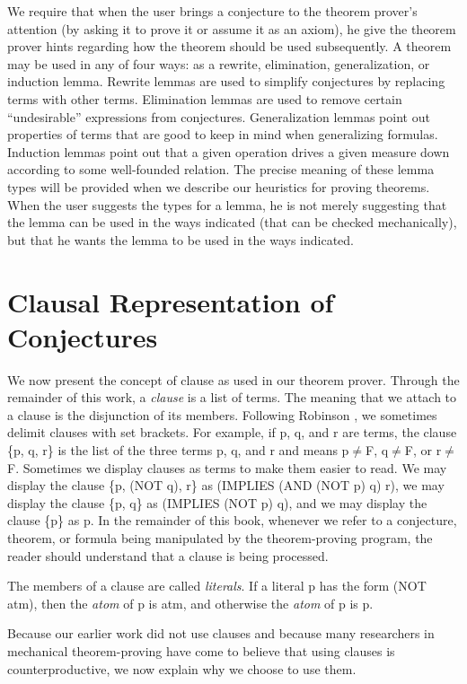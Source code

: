 \documentclass[11pt]{book}
\newcommand{\pubinlineunderline}[1]{\emph{#1}}
\newcommand{\pubdefaulttextsize}{\large}
\begin{document}
We  require that when the user brings a  conjecture
to the theorem prover's attention (by asking it to prove it or assume it as an axiom), he give
the theorem prover 
hints regarding how the theorem should be used subsequently.
A theorem may be used in any of four ways:
as a rewrite, elimination, generalization, or induction lemma.
Rewrite lemmas are used to simplify conjectures by replacing terms with other
terms.  Elimination lemmas are used to remove certain ``undesirable''
expressions from conjectures.  Generalization lemmas point out properties
of terms that are good to keep in mind when generalizing formulas.
Induction lemmas point out that a given operation drives a given
measure down according to some well-founded relation.
The precise meaning of these lemma types will be
provided when we describe our heuristics for proving theorems.
When the user suggests the types for a lemma, he is not merely suggesting
that the lemma can be used in the ways indicated
(that can be checked mechanically),
but that  he wants the lemma to be used in the ways indicated.
\section{Clausal Representation of Conjectures}
\pubdefaulttextsize
We now present the concept of clause as used in our
theorem prover.  Through the remainder of this
work,
a \pubinlineunderline{clause} is a list of terms.  The meaning that we attach to
a clause is the disjunction of its members.
Following Robinson \cite{ROBINSON}, we sometimes delimit
clauses with set brackets.
For example, if p, q, and r are terms, the clause \{p, q, r\}
is the list of the three terms p, q, and r and means p$\neq$F,
q$\neq$F, or r$\neq$F.
Sometimes we display clauses as terms to make them easier
to read.  We may display the clause \{p, (NOT q), r\} as
(IMPLIES (AND (NOT p) q) r),  we may display the clause
\{p, q\} as (IMPLIES (NOT p) q), and we may display the
clause \{p\} as p.
In the remainder of this book, whenever we refer to a conjecture,
theorem, or formula being manipulated by the theorem-proving program,
the reader should understand that a clause is being processed.

The
members of a clause are called \pubinlineunderline{literals}.
If a literal p has the form (NOT atm), then the \pubinlineunderline{atom} of p is atm, and
otherwise the \pubinlineunderline{atom} of p is p.

Because our earlier work \cite{JACM} did not use clauses and because many
researchers in mechanical theorem-proving have come to believe
that using clauses is counterproductive, we now explain
why we choose to use them.
\end{document}
